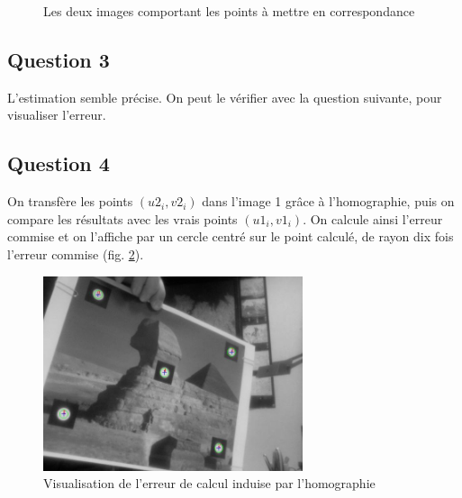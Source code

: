 \documentclass{article}
\begin{document}
\begin{figure}[!ht]%
  \centering
  \hspace{0.030\textwidth}
  \caption{Les deux images comportant les points à mettre en correspondance}
  \label{fig_init}
\end{figure}

\subsection{Question 3}
L'estimation semble précise. On peut le vérifier avec la question suivante, pour visualiser l'erreur.

\subsection{Question 4}
On transfère les points $(u2_i, v2_i)$ dans l'image 1 grâce à l'homographie, puis on compare les
résultats avec les vrais points $(u1_i, v1_i)$. On calcule ainsi l'erreur commise et on l'affiche par
un cercle centré sur le point calculé, de rayon dix fois l'erreur commise (fig. \ref{erreur}).

\begin{figure}[!ht]
    \center
    \includegraphics[width=0.68\textwidth]{img/resultat.jpg}
    \caption{Visualisation de l'erreur de calcul induise par l'homographie}
    \label{erreur}
\end{figure}
\end{document}
